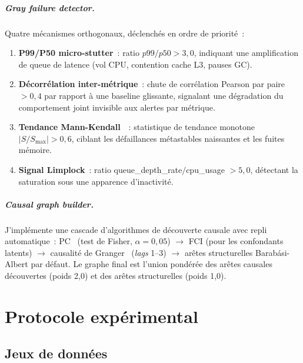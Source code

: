 \documentclass[a4paper,11pt,oneside]{report}
\begin{document}
\paragraph{Gray failure detector.}
\label{sec:methode-gray}
Quatre m\'ecanismes orthogonaux, d\'eclench\'es en ordre de priorit\'e~:
\begin{enumerate}
  \item \textbf{P99/P50 micro-stutter}~: ratio $p99/p50 > 3{,}0$, indiquant une amplification de queue de latence (vol CPU, contention cache L3, pauses GC).
  \item \textbf{D\'ecorr\'elation inter-m\'etrique}~: chute de corr\'elation Pearson par paire $> 0{,}4$ par rapport \`a une baseline glissante, signalant une d\'egradation du comportement joint invisible aux alertes par m\'etrique.
  \item \textbf{Tendance Mann-Kendall}~\cite{mann1945trend}~: statistique de tendance monotone $\lvert S/S_{\max} \rvert > 0{,}6$, ciblant les d\'efaillances m\'etastables naissantes et les fuites m\'emoire.
  \item \textbf{Signal Limplock}~: ratio queue\_depth\_rate$/$cpu\_usage $> 5{,}0$, d\'etectant la saturation sous une apparence d'inactivit\'e.
\end{enumerate}

\paragraph{Causal graph builder.}
\label{sec:methode-causal}
J'impl\'emente une cascade d'algorithmes de d\'ecouverte causale avec repli automatique~: PC~\cite{spirtes2000causation} (test de Fisher, $\alpha{=}0{,}05$) $\to$ FCI (pour les confondants latents) $\to$ causalit\'e de Granger~\cite{granger1969causality} (\emph{lags} 1--3) $\to$ ar\^etes structurelles Barab\'asi-Albert par d\'efaut. Le graphe final est l'union pond\'er\'ee des ar\^etes causales d\'ecouvertes (poids 2{,}0) et des ar\^etes structurelles (poids 1{,}0).

\chapter{Protocole exp\'erimental}
\label{chap:experiences}

\section{Jeux de donn\'ees}
\label{sec:datasets}
\end{document}
